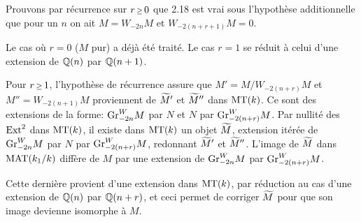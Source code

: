 Prouvons par r\'ecurrence sur $r\Ge 0$ que 2.18
est vrai sous l'hypoth\`ese additionnelle que
pour un $n$ on ait $M=W_{-2n}M$ et
$W_{-2(n+r+1)}M=0$.

Le cas o\`u $r=0$ ($M$ pur) a d\'ej\`a \'et\'e
trait\'e.
Le cas $r=1$ se r\'eduit \`a celui d'une
extension de ${\Bbb Q}(n)$ par ${\Bbb Q}(n+1)$.

Pour $r\Ge 1$, l'hypoth\`ese de r\'ecurrence
assure que $M'=M/W_{-2(n+r)}M$ et
$M''=W_{-2(n+1)}M$ proviennent de $\widetilde{M}'$ et
$\widetilde{M}''$ dans $\text{\rm MT}(k)$.
Ce sont des extensions de la forme:
$\text{\rm Gr}_{-2n}^WM$ par $N$ et $N$ par
$\text{\rm Gr}_{-2(n+r)}^W M$.
Par nullit\'e des $\text{\rm Ext}^2$ dans $\text{\rm MT}(k)$, il
existe dans $\text{\rm MT}(k)$ un objet $\widetilde{M}$,
extension it\'er\'ee de $\text{\rm Gr}_{-2n}^WM$ par $N$
par $\text{\rm Gr}_{-2(n+r)}^WM$, redonnant $\widetilde{M}'$
et $\widetilde{M}''$.
L'image de $\widetilde{M}$ dans $\text{\rm MAT}(k_1/k)$ diff\`ere de
$M$ par une extension de $\text{\rm Gr}_{-2n}^WM$ par
$\text{\rm Gr}_{-2(n+r)}^W M$.
\enddemo

Cette derni\`ere provient d'une extension dans
$\text{\rm MT}(k)$, par r\'eduction au cas d'une
extension de ${\Bbb Q}(n)$ par ${\Bbb Q}(n+r)$, 
et ceci permet de corriger $\widetilde{M}$ pour que son
image devienne isomorphe \`a $M$.

